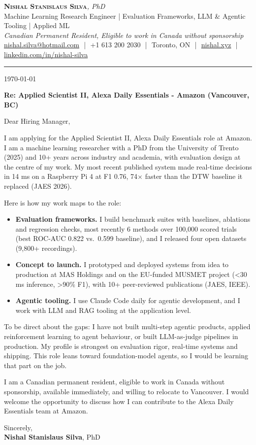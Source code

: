 \documentclass[11pt]{article}
\makeatletter
\newcommand{\clName}{Nishal Stanislaus Silva}
\newcommand{\clEmail}{nishal.silva@hotmail.com}
\newcommand{\clPhone}{+1 613 200 2030}
\newcommand{\clCity}{Toronto, ON}
\newcommand{\clSite}{https://nishal.xyz}
\newcommand{\clLinkedIn}{https://www.linkedin.com/in/nishal-silva}
\newcommand{\clStatus}{Canadian Permanent Resident, Eligible to work in Canada without sponsorship}
\newcommand{\clTagline}{Machine Learning Research Engineer | Evaluation Frameworks, LLM \& Agentic Tooling | Applied ML}
\newcommand{\clRole}{Applied Scientist II, Alexa Daily Essentials}
\newcommand{\clCompany}{Amazon}
\newcommand{\clTeam}{the Alexa Daily Essentials team}
\newcommand{\clAddressee}{Dear Hiring Manager,}
\makeatother
\begin{document}
\pagestyle{empty}

\begin{center}
    {\LARGE \scshape \textbf{\clName}}{\large \textit{, PhD}}
    \\[1pt]
    {\small \clTagline}
    \\[1pt]
    {\footnotesize\textit{\clStatus}}
    \\[1pt]
    {\small
    \href{mailto:\clEmail}{\clEmail}
    \,\,|\,\, \clPhone
    \,\,|\,\, \clCity
    \,\,|\,\, \href{\clSite}{nishal.xyz}
    \,\,|\,\, \href{\clLinkedIn}{linkedin.com/in/nishal-silva}}
\end{center}

\rule{\linewidth}{0.4pt}\vspace{0.6em}

\today

\textbf{Re: \clRole{} - \clCompany{} (Vancouver, BC)}

\clAddressee

I am applying for the \clRole{} role at \clCompany{}. I am a machine learning researcher with a PhD from the University of Trento (2025) and 10+ years across industry and academia, with evaluation design at the centre of my work. My most recent published system made real-time decisions in 14 ms on a Raspberry Pi 4 at F1 0.76, 74$\times$ faster than the DTW baseline it replaced (JAES 2026).

Here is how my work maps to the role:
\begin{itemize}[leftmargin=1.4em, itemsep=0.1em, topsep=0.2em]
    \item \textbf{Evaluation frameworks.} I build benchmark suites with baselines, ablations and regression checks, most recently 6 methods over 100,000 scored trials (best ROC-AUC 0.822 vs.\ 0.599 baseline), and I released four open datasets (9,800+ recordings).
    \item \textbf{Concept to launch.} I prototyped and deployed systems from idea to production at MAS Holdings and on the EU-funded MUSMET project (<30 ms inference, >90\% F1), with 10+ peer-reviewed publications (JAES, IEEE).
    \item \textbf{Agentic tooling.} I use Claude Code daily for agentic development, and I work with LLM and RAG tooling at the application level.
\end{itemize}
To be direct about the gaps: I have not built multi-step agentic products, applied reinforcement learning to agent behaviour, or built LLM-as-judge pipelines in production. My profile is strongest on evaluation rigor, real-time systems and shipping. This role leans toward foundation-model agents, so I would be learning that part on the job.

I am a Canadian permanent resident, eligible to work in Canada without sponsorship, available immediately, and willing to relocate to Vancouver. I would welcome the opportunity to discuss how I can contribute to \clTeam{} at \clCompany{}.

\vspace{8pt}
Sincerely,\\[2pt]
\textbf{\clName}, PhD
\end{document}
